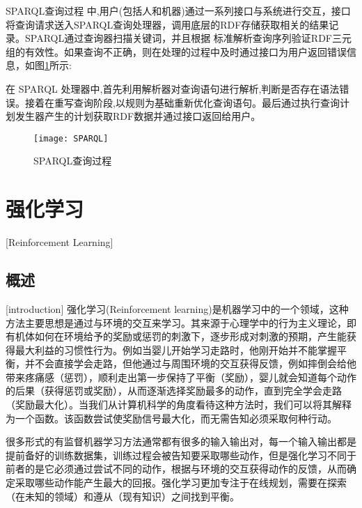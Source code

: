 SPARQL查询过程 中,用户(包括人和机器)通过一系列接口与系统进行交互，接口将查询请求送入SPARQL查询处理器，调用底层的RDF存储获取相关的结果记录。SPARQL通过查询器扫描关键词，并且根据
标准解析查询序列验证RDF三元组的有效性。如果查询不正确，则在处理的过程中及时通过接口为用户返回错误信息，如图\ref{SPARQL查询过程}所示:

在 SPARQL 处理器中,首先利用解析器对查询语句进行解析,判断是否存在语法错误。接着在重写查询阶段,以规则为基础重新优化查询语句。最后通过执行查询计划发生器产生的计划获取RDF数据并通过接口返回给用户。
\begin{figure}[h]
\centering
\texttt{[image: SPARQL]}
\caption{SPARQL查询过程}
\label{SPARQL查询过程}
\end{figure}

\section{强化学习}[Reinforcement Learning]
\subsection{概述}[introduction]
强化学习(Reinforcement learning)\cite{RLIntroduction}是机器学习中的一个领域，这种方法主要思想是通过与环境的交互来学习。其来源于心理学中的行为主义理论，即有机体如何在环境给予的奖励或惩罚的刺激下，逐步形成对刺激的预期，产生能获得最大利益的习惯性行为。例如当婴儿开始学习走路时，他刚开始并不能掌握平衡，并不会直接学会走路，但他通过与周围环境的交互获得反馈，例如摔倒会给他带来疼痛感（惩罚），顺利走出第一步保持了平衡（奖励），婴儿就会知道每个动作的后果（获得惩罚或奖励），从而逐渐选择奖励最多的动作，直到完全学会走路（奖励最大化）。当我们从计算机科学的角度看待这种方法时，我们可以将其解释为一个函数。该函数尝试使奖励信号最大化，而无需告知必须采取何种行动。

很多形式的有监督机器学习方法通常都有很多的输入输出对，每一个输入输出都是提前备好的训练数据集，训练过程会被告知要采取哪些动作，但是强化学习不同于前者的是它必须通过尝试不同的动作，根据与环境的交互获得动作的反馈，从而确定采取哪些动作能产生最大的回报。强化学习更加专注于在线规划，需要在探索（在未知的领域）和遵从（现有知识）之间找到平衡。

